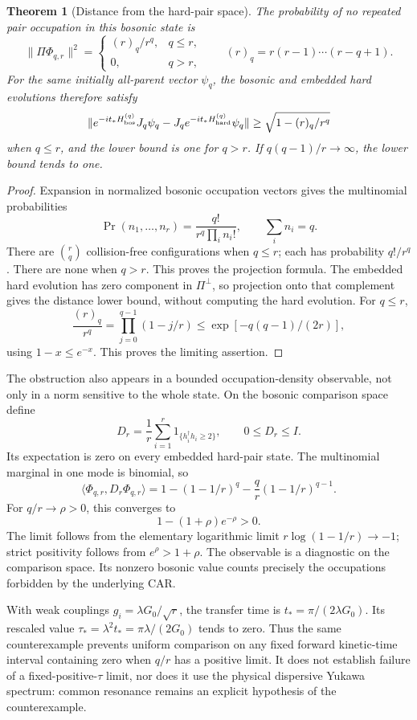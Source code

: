 \documentclass[11pt]{article}
\newtheorem{theorem}{Theorem}[section]
\theoremstyle{remark}
\begin{document}
\begin{theorem}[Distance from the hard-pair space]
\label{thm:v20v58-collision}
The probability of no repeated pair occupation in this
bosonic state is
\[
 \|\Pi\Phi_{q,r}\|^2=
 \begin{cases}
 (r)_q/r^q,&q\leq r,\\
 0,&q>r,
 \end{cases}
 \qquad (r)_q=r(r-1)\cdots(r-q+1).
\]
For the same initially all-parent vector \(\psi_q\),
the bosonic and embedded hard evolutions therefore satisfy
\[
 \|e^{-it_*H_{\rm bos}^{(q)}}J_q\psi_q
      -J_qe^{-it_*H_{\rm hard}^{(q)}}\psi_q\|
 \geq\sqrt{1-(r)_q/r^q}
\]
when \(q\leq r\), and the lower bound is one for \(q>r\).
If \(q(q-1)/r\to\infty\), the lower bound tends to one.
\end{theorem}
\begin{proof}
Expansion in normalized bosonic occupation vectors gives
the multinomial probabilities
\[
 \Pr(n_1,\ldots,n_r)=
       \frac{q!}{r^q\prod_i n_i!},\qquad\sum_i n_i=q.
\]
There are \(\binom rq\) collision-free configurations when
\(q\leq r\); each has probability \(q!/r^q\).
There are none when \(q>r\).  This proves the projection
formula.  The embedded hard evolution has zero component
in \(\Pi^\perp\), so projection onto that complement gives
the distance lower bound, without computing the hard evolution.
For \(q\leq r\),
\[
 \frac{(r)_q}{r^q}
   =\prod_{j=0}^{q-1}(1-j/r)
   \leq \exp[-q(q-1)/(2r)],
\]
using \(1-x\leq e^{-x}\).  This proves the limiting assertion.
\end{proof}

The obstruction also appears in a bounded occupation-density
observable, not only in a norm sensitive to the whole state.
On the bosonic comparison space define
\[
 D_r=\frac1r\sum_{i=1}^r 1_{\{h_i^\dagger h_i\geq2\}},
 \qquad 0\leq D_r\leq I .
\]
Its expectation is zero on every embedded hard-pair state.
The multinomial marginal in one mode is binomial, so
\[
 \langle\Phi_{q,r},D_r\Phi_{q,r}\rangle
 =1-(1-1/r)^q-\frac qr(1-1/r)^{q-1}.
\]
For \(q/r\to\rho>0\), this converges to
\[
 1-(1+\rho)e^{-\rho}>0.
\]
The limit follows from the elementary logarithmic limit
\(r\log(1-1/r)\to-1\); strict positivity follows from
\(e^\rho>1+\rho\).  The observable is a diagnostic on the
comparison space.  Its nonzero bosonic value counts precisely
the occupations forbidden by the underlying CAR.

With weak couplings \(g_i=\lambda G_0/\sqrt r\),
the transfer time is \(t_*=\pi/(2\lambda G_0)\).
Its rescaled value
\(\tau_*=\lambda^2t_*=\pi\lambda/(2G_0)\) tends to zero.
Thus the same counterexample prevents uniform comparison
on any fixed forward kinetic-time interval containing zero
when \(q/r\) has a positive limit.  It does not establish
failure of a fixed-positive-\(\tau\) limit, nor does it use
the physical dispersive Yukawa spectrum: common resonance
remains an explicit hypothesis of the counterexample.
\end{document}
